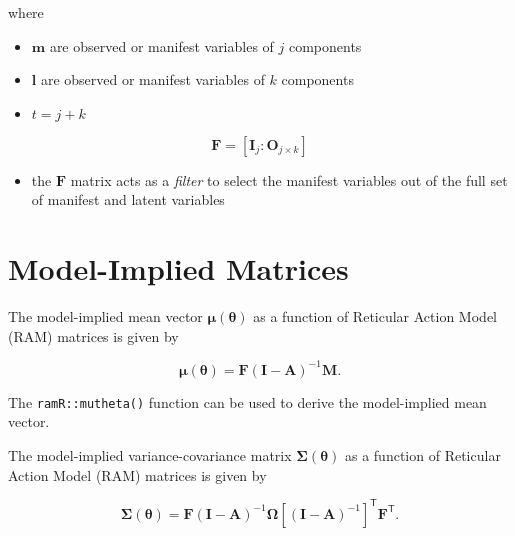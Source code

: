 \documentclass[
]{book}
\providecommand{\tightlist}{%
  \setlength{\itemsep}{0pt}\setlength{\parskip}{0pt}}
\begin{document}
\noindent where

\begin{itemize}
\tightlist
\item
  \(\mathbf{m}\) are observed or manifest variables of \(j\) components
\item
  \(\mathbf{l}\) are observed or manifest variables of \(k\) components
\item
  \(t = j + k\)
\end{itemize}

\begin{equation}
  \mathbf{F}
  =
  \left[
    \mathbf{I}_{j} \colon \mathbf{O}_{j \times k}
  \right]
\end{equation}

\begin{itemize}
\tightlist
\item
  the \(\mathbf{F}\) matrix acts as a \emph{filter} to select the manifest variables
  out of the full set of manifest and latent variables
\end{itemize}

\hypertarget{model-implied-matrices}{%
\section{Model-Implied Matrices}\label{model-implied-matrices}}

The model-implied mean vector
\(\boldsymbol{\mu} \left( \boldsymbol{\theta} \right)\)
as a function of Reticular Action Model (RAM) matrices
is given by

\begin{equation}
  \boldsymbol{\mu} \left( \boldsymbol{\theta} \right)
  =
  \mathbf{F}
  \left( \mathbf{I} - \mathbf{A} \right)^{-1}
  \mathbf{M} .
\end{equation}

\noindent The \texttt{ramR::mutheta()} function can be used
to derive the model-implied mean vector.

The model-implied variance-covariance matrix
\(\boldsymbol{\Sigma} \left( \boldsymbol{\theta} \right)\)
as a function of Reticular Action Model (RAM) matrices
is given by

\begin{equation}
  \boldsymbol{\Sigma} \left( \boldsymbol{\theta} \right)
  =
  \mathbf{F}
  \left( \mathbf{I} - \mathbf{A} \right)^{-1}
  \boldsymbol{\Omega}
  \left[ \left( \mathbf{I} - \mathbf{A} \right)^{-1} \right]^{\mathsf{T}}
  \mathbf{F}^{\mathsf{T}} .
\end{equation}
\end{document}
